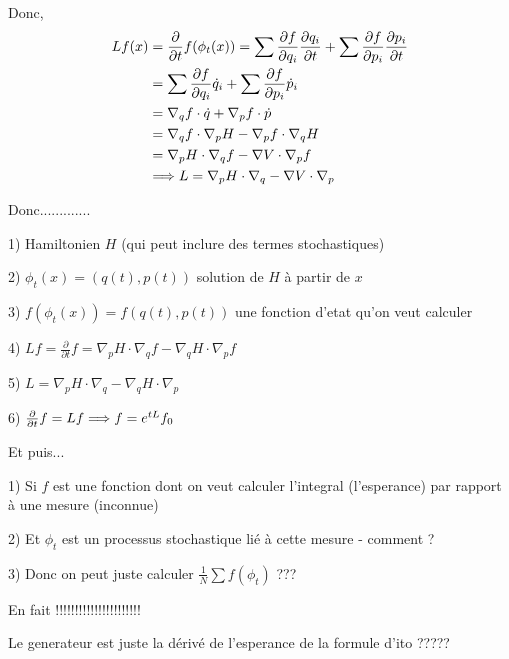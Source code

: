 Donc,
\begin{align}
Lf(x) &= \frac{\partial}{\partial t} f(\phi_t(x))
= \sum \frac{\partial f}{\partial q_i} \frac{\partial q_i}{\partial t}
+ \sum \frac{\partial f}{\partial p_i} \frac{\partial p_i}{\partial t} \\
%
&= \sum \frac{\partial f}{\partial q_i} \dot q_i
+ \sum \frac{\partial f}{\partial p_i} \dot p_i \\
%
&= \nabla_q f \cdot \dot q + \nabla_p f \cdot \dot p \\
&= \nabla_q f \cdot \nabla_p H - \nabla_p f \cdot \nabla_q H \\
&= \nabla_p H \cdot \nabla_q f - \nabla V \cdot \nabla_p f \\
& \implique L = \nabla_p H \cdot \nabla_q - \nabla V \cdot \nabla_p
%
\end{align}

\newpage
Donc.............

1) Hamiltonien $H$ (qui peut inclure des termes stochastiques)

2) $\phi_t(x) = (q(t), p(t))$ solution de $H$ à partir de $x$

3) $f(\phi_t(x)) = f(q(t), p(t))$ une fonction d'etat qu'on veut calculer

4) $Lf = \frac{\partial}{\partial t} f
   = \nabla_p H \cdot \nabla_q f - \nabla_q H \cdot \nabla_p f$

5) $L = \nabla_p H \cdot \nabla_q - \nabla_q H \cdot \nabla_p$

6) $\frac{\partial}{\partial t} f = Lf \Longrightarrow f = e^{tL} f_0$

\vspace{3.0mm}
Et puis...

1) Si $f$ est une fonction dont on veut calculer l'integral (l'esperance)
par rapport à une mesure (inconnue)

2) Et $\phi_t$ est un processus stochastique lié à cette mesure - comment ?

3) Donc on peut juste calculer $\frac{1}{N} \sum f(\phi_t)$ ???

\vspace{3.0mm}
En fait !!!!!!!!!!!!!!!!!!!!!!

Le generateur est juste la dérivé de l'esperance de la formule d'ito ?????

